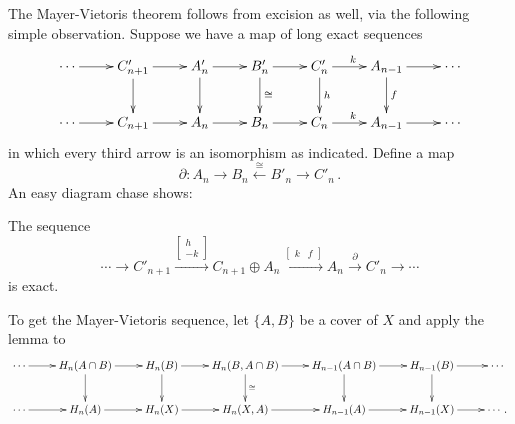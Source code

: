 The Mayer-Vietoris theorem follows from excision as well, via
the following simple observation.
Suppose we have a map of long exact sequences
\begin{equation*}
\xymatrix{
\cdots\ar[r] & C'_{n+1} \ar[r]\ar[d] & A'_n\ar[r]\ar[d] & 
B'_n\ar[r]\ar[d]^\cong & 
C'_n\ar[r]^k\ar[d]^h & A_{n-1}\ar[r]\ar[d]^f & \cdots\\
\cdots\ar[r] & C_{n+1} \ar[r] & A_n \ar[r] & B_n \ar[r] & C_n \ar[r]^k & 
A_{n-1}\ar[r] & \cdots
}
\end{equation*}
in which every third arrow is an isomorphism as indicated.
Define a map
\[
\partial:A_n\to B_n\xleftarrow{\cong} B'_n\to C'_n\,.
\]
An easy diagram chase shows:
\begin{lemma} 
\label{lem-ladder}
The sequence 
\begin{equation*}
\cdots\longrightarrow 
C'_{n+1}\xrightarrow{\left[\begin{array}{c}h\\-k\end{array}\right]}
C_{n+1}\oplus A_n\xrightarrow{\left[\begin{array}{cc}k&f\end{array}\right]}
A_n\xrightarrow{\,\,\partial\,\,} C'_n\longrightarrow\cdots
\end{equation*}
is exact.
\end{lemma}
To get the Mayer-Vietoris sequence, let $\{A,B\}$ be a cover of $X$ 
and apply the lemma to 
\[
\xymatrix{
\cdots \ar[r] & H_n(A\cap B) \ar[d] \ar[r] & H_n(B)  \ar[d] \ar[r] &
H_n(B,A\cap B) \ar[d]^\cong \ar[r] & H_{n-1}(A\cap B) \ar[d] \ar[r] &
H_{n-1}(B) \ar[d] \ar[r] & \cdots \\
\cdots \ar[r] & H_n(A) \ar[r] & H_n(X) \ar[r] & H_n(X,A) \ar[r] & 
H_{n-1}(A) \ar[r] & H_{n-1}(X) \ar[r] & \cdots\,.
}\]

